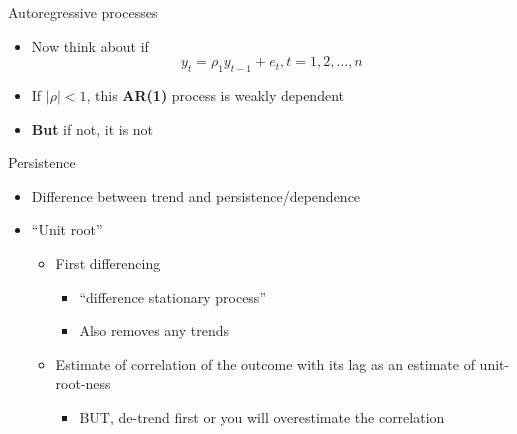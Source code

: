 \documentclass[
  ignorenonframetext,
]{beamer}
\providecommand{\tightlist}{%
  \setlength{\itemsep}{0pt}\setlength{\parskip}{0pt}}
\newcommand{\setsep}{\setlength{\itemsep}{3pt}}
\newcommand{\setskip}{\setlength{\parskip}{3pt}}
\renewcommand{\tightlist}{\setsep\setskip}
\begin{document}
\begin{frame}{Autoregressive processes}
\protect\hypertarget{autoregressive-processes}{}
\pause

\begin{itemize}[<+->]
\tightlist
\item
  Now think about if \[ y_t = \rho_1 y_{t-1} + e_t, t = 1, 2, \dots, n \]
\item
  If \(|\rho| < 1\), this \textbf{AR(1)} process is weakly dependent
\item
  \textbf{But} if not, it is not
\end{itemize}
\end{frame}

\begin{frame}{Persistence}
\protect\hypertarget{persistence}{}
\begin{itemize}[<+->]
\tightlist
\item
  Difference between trend and persistence/dependence
\item
  ``Unit root''

  \begin{itemize}[<+->]
  \tightlist
  \item
    First differencing

    \begin{itemize}[<+->]
    \tightlist
    \item
      ``difference stationary process''
    \item
      Also removes any trends
    \end{itemize}
  \item
    Estimate of correlation of the outcome with its lag as an estimate of unit-root-ness

    \begin{itemize}[<+->]
    \tightlist
    \item
      BUT, de-trend first or you will overestimate the correlation
    \end{itemize}
  \end{itemize}
\end{itemize}
\end{frame}
\end{document}
